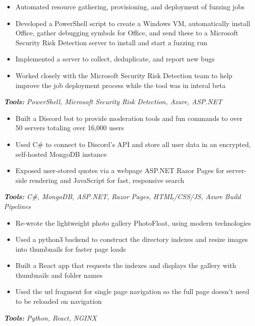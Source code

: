 \documentclass[10pt,letter]{altacv}
\begin{document}
\begin{itemize}
\item Automated resource gathering, provisioning, and deployment of fuzzing jobs
\item Developed a PowerShell script to create a Windows VM, automatically install Office, gather debugging symbols for Office, and send these to a Microsoft \\ Security Risk Detection server to install and start a fuzzing run
\item Implemented a server to collect, deduplicate, and report new bugs
\item Worked closely with the Microsoft Security Risk Detection team to help improve the job deployment process while the tool was in interal beta
\end{itemize}
\textit{\textbf{Tools:} PowerShell, Microsoft Security Risk Detection, Azure, ASP.NET}

\medskip 


\begin{itemize}
\item Built a Discord bot to provide moderation tools and fun commands to over 50 servers totaling over 16,000 users
\item Used C\# to connect to Discord's API and store all user data in an encrypted, self-hosted MongoDB instance
\item Exposed user-stored quotes via a webpage ASP.NET Razor Pages for server-side rendering and JavaScript for fast, responsive search
\end{itemize}
\textit{\textbf{Tools:} C\#, MongoDB, ASP.NET, Razor Pages, HTML/CSS/JS, Azure Build Pipelines}

\smallskip
\divider
\smallskip

\begin{itemize}
\item Re-wrote the lightweight photo gallery PhotoFloat, using modern technologies
\item Used a python3 backend to construct the directory indexes and resize images into thumbnails for faster page loads
\item Built a React app that requests the indexes and displays the gallery with thumbnails and folder names
\item Used the url fragment for single page navigation so the full page doesn't need to be reloaded on navigation
\end{itemize}
\textit{\textbf{Tools:} Python, React, NGINX}
\end{document}

